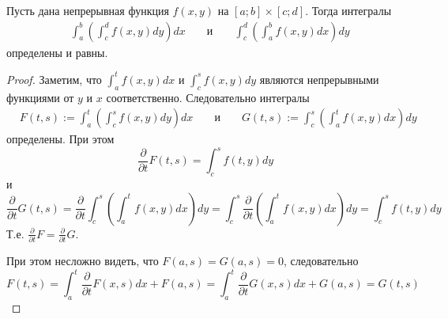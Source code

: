 \documentclass[12pt,a4paper]{article}
\begin{document}
    \begin{theorem}
        Пусть дана непрерывная функция $f(x, y)$ на $[a; b] \times [c; d]$. Тогда интегралы
        \begin{align*}
            &\int_a^b \left(\int_c^d f(x, y) dy\right) dx&
            &\text{ и }&
            &\int_c^d \left(\int_a^b f(x, y) dx\right) dy
        \end{align*}
        определены и равны.
    \end{theorem}

    \begin{proof}
        Заметим, что $\int_a^t f(x, y) dx$ и $\int_c^s f(x, y) dy$ являются непрерывными функциями от $y$ и $x$ соответственно. Следовательно интегралы
        \begin{align*}
            &F(t, s) := \int_a^t \left(\int_c^s f(x, y) dy\right) dx&
            &\text{ и }&
            &G(t, s) := \int_c^s \left(\int_a^t f(x, y) dx\right) dy
        \end{align*}
        определены. При этом
        \[\frac{\partial}{\partial t} F(t, s) = \int_c^s f(t, y) dy\]
        и
        \[
            \frac{\partial}{\partial t} G(t, s)
            = \frac{\partial}{\partial t} \int_c^s \left(\int_a^t f(x, y) dx\right) dy
            = \int_c^s \frac{\partial}{\partial t} \left(\int_a^t f(x, y) dx\right) dy
            = \int_c^s f(t, y) dy
        \]
        Т.е. $\frac{\partial}{\partial t} F = \frac{\partial}{\partial t} G$.

        При этом несложно видеть, что $F(a, s) = G(a, s) = 0$, следовательно
        \[
            F(t, s)
            = \int_a^t \frac{\partial}{\partial t} F(x, s) dx + F(a, s)
            = \int_a^t \frac{\partial}{\partial t} G(x, s) dx + G(a, s)
            = G(t, s)
        \]
    \end{proof}

\end{document}
